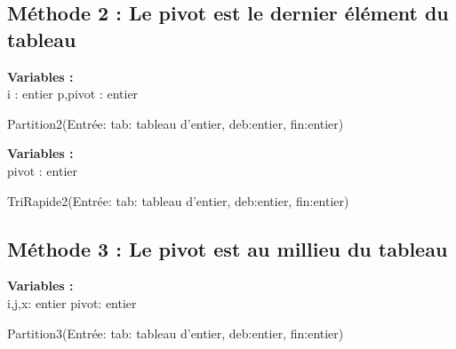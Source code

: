 \subsection{Méthode 2 : Le pivot est le dernier élément du tableau}
\par
\begin{function}[H]
    \textbf{Variables :}\\
     i : entier\;
     p,pivot : entier\;
    \caption{Partition2(Entrée: tab: tableau d'entier, deb:entier, fin:entier)}
\end{function}
\par
\begin{function}[H]
    \textbf{Variables :}\\
     pivot : entier\;
    \caption{TriRapide2(Entrée: tab: tableau d'entier, deb:entier, fin:entier)}
\end{function}
\subsection{Méthode 3 : Le pivot est au millieu du tableau}
\par
\begin{function}[H]
    \textbf{Variables :}\\
     i,j,x: entier\;
     pivot: entier\;
    \caption{Partition3(Entrée: tab: tableau d'entier, deb:entier, fin:entier)}
\end{function}


